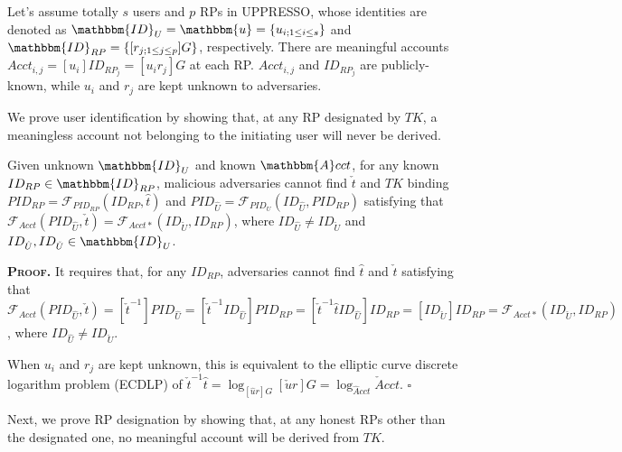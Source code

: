 Let's assume totally $s$ users and $p$ RPs in UPPRESSO,
    whose identities are denoted as $\mathbbm{ID}_U = \mathbbm{u} = \{u_{i; 1 \leq i \leq s}\}$ and $\mathbbm{ID}_{RP} = \{[r_{j;1 \leq j \leq p}]G\}$, respectively.
There are meaningful accounts $Acct_{i,j}=[u_i]ID_{RP_j} = [u_i r_j]G$ at each RP.
$Acct_{i,j}$ and $ID_{RP_j}$ are publicly-known, while $u_{i}$ and $r_{j}$ are kept unknown to adversaries.



We prove user identification by showing that,
    at any RP designated by $TK$,
        a meaningless account not belonging to the initiating user will never be derived.

\vspace{1.5mm}
\begin{thm} Given unknown $\mathbbm{ID}_U$ and known $\mathbbm{A}cct$,
for any known $ID_{RP} \in \mathbbm{ID}_{RP}$, 
     malicious adversaries cannot find $\check{t}$ and $TK$ binding $PID_{RP} = \mathcal{F}_{PID_{RP}}(ID_{RP}, \hat{t})$
     and $PID_{\hat{U}}=\mathcal{F}_{PID_U}(ID_{\hat{U}}, PID_{RP})$ satisfying that $\mathcal{F}_{Acct}(PID_{\hat{U}}, \check{t}) = \mathcal{F}_{Acct\ast}(ID_{\check{U}}, ID_{RP})$, where $ID_{\hat{U}} \neq ID_{\check{U}}$ and $ID_{\hat{U}},ID_{\check{U}} \in \mathbbm{ID}_U$.
\label{thm-u-id}
\end{thm}

\noindent\textbf{\textsc{Proof.}}
It requires that, for any $ID_{RP}$, adversaries cannot find $\hat{t}$ and $\check{t}$ satisfying that $\mathcal{F}_{Acct}(PID_{\hat{U}}, \check{t}) = [\check{t}^{-1}]PID_{\hat{U}} = [\check{t}^{-1}ID_{\hat{U}}]PID_{RP}
= [\check{t}^{-1}\hat{t}ID_{\hat{U}}]ID_{RP}
    = [ID_{\check{U}}]ID_{RP} = \mathcal{F}_{Acct\ast}(ID_{\check{U}}, ID_{RP})$,
where $ID_{\hat{U}} \neq ID_{\check{U}}$.

When $u_{i}$ and $r_{j}$ are kept unknown, this is equivalent to the elliptic curve discrete logarithm problem (ECDLP) of $\check{t}^{-1}\hat{t} = \log_{[\hat{u}r]G}{[\check{u}r]G} = \log_{\hat{A}cct}{\check{A}cct}$.
\hfill $\square$

\vspace{1.5mm}

Next,
we prove RP designation by showing that,
    at any honest RPs other than the designated one, no meaningful account will be derived from $TK$.

